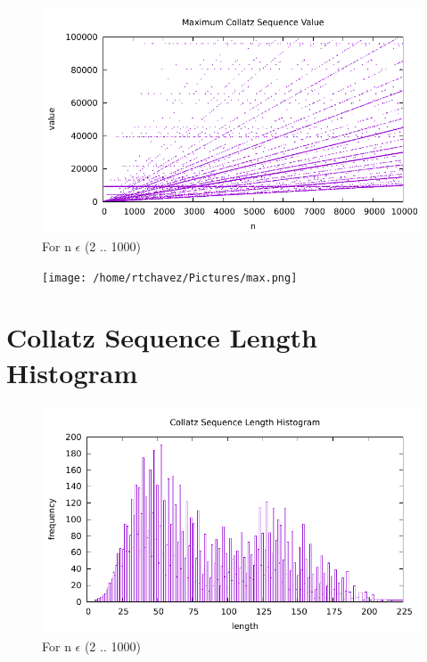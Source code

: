 \documentclass[11pt]{article} %
\begin{document}
\begin{figure}
\centering
\includegraphics[scale=1.]{max.pdf}
\caption{For n $ \epsilon $ (2 .. 1000)}
\label{}
\end{figure}
\pagebreak

\begin{figure}
\centering
\texttt{[image: /home/rtchavez/Pictures/max.png]}
\caption{}
\label{}
\end{figure}
\pagebreak

\section*{Collatz Sequence Length Histogram}
\begin{figure}[htp]
\centering
\includegraphics[scale=1.00]{histogram.pdf}
\caption{For n $ \epsilon $ (2 .. 1000)}
\label{}
\end{figure}
\end{document}

